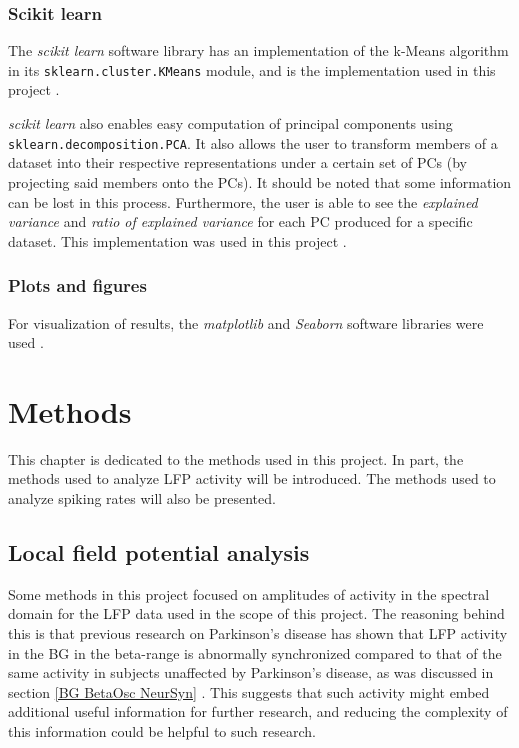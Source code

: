 \documentclass{kththesis}
\begin{document}
\subsection{Scikit learn}\label{SK BG}

The \textit{scikit learn} software library has an implementation of the k-Means algorithm in its \texttt{sklearn.cluster.KMeans} module, and is the implementation used in this project \parencite{SKLEARN}.

\textit{scikit learn} also enables easy computation of principal components using \texttt{sklearn.decomposition.PCA}.
It also allows the user to transform members of a dataset into their respective representations under a certain set of PCs (by projecting said members onto the PCs). 
It should be noted that some information can be lost in this process.
Furthermore, the user is able to see the \textit{explained variance} and \textit{ratio of explained variance} for each PC produced for a specific dataset. 
This implementation was used in this project \parencite{SKLEARN}.

\subsection{Plots and figures}

For visualization of results, the \textit{matplotlib} and \textit{Seaborn} software libraries were used \parencite{MPL} \parencite{Seaborn}.

\newpage
\chapter{Methods}

This chapter is dedicated to the methods used in this project.
In part, the methods used to analyze LFP activity will be introduced.
The methods used to analyze spiking rates will also be presented.

\section{Local field potential analysis}

Some methods in this project focused on amplitudes of activity in the spectral domain for the LFP data used in the scope of this project.
The reasoning behind this is that previous research on Parkinson's disease has shown that LFP activity in the BG in the beta-range is abnormally synchronized compared to that of the same activity in subjects unaffected by Parkinson's disease, as was discussed in section \ref{BG BetaOsc NeurSyn} \parencite{Cagnan}.
This suggests that such activity might embed additional useful information for further research, and reducing the complexity of this information could be helpful to such research. 
\end{document}

